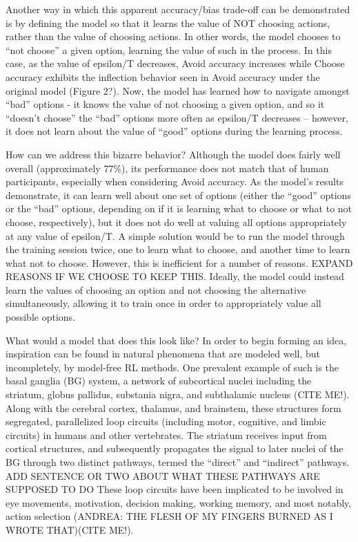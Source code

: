 \documentclass[10pt,letterpaper]{article}
\begin{document}
Another way in which this apparent accuracy/bias trade-off can be demonstrated is by defining the model so that it learns the value of NOT choosing actions, rather than the value of choosing actions. In other words, the model chooses to “not choose” a given option, learning the value of such in the process. In this case, as the value of epsilon/T decreases, Avoid accuracy increases while Choose accuracy exhibits the inflection behavior seen in Avoid accuracy under the original model (Figure 2?). Now, the model has learned how to navigate amongst “bad” options - it knows the value of not choosing a given option, and so it “doesn’t choose” the “bad” options more often as epsilon/T  decreases – however, it does not learn about the value of “good” options during the learning process.

How can we address this bizarre behavior? Although the model does fairly well overall (approximately 77\%), its performance does not match that of human participants, especially when considering Avoid accuracy. As the model’s results demonstrate, it can learn well about one set of options (either the “good” options or the “bad” options, depending on if it is learning what to choose or what to not choose, respectively), but it does not do well at valuing all options appropriately at any value of epsilon/T. A simple solution would be to run the model through the training session twice, one to learn what to choose, and another time to learn what not to choose. However, this is inefficient for a number of reasons. EXPAND REASONS IF WE CHOOSE TO KEEP THIS. Ideally, the model could instead learn the values of choosing an option and not choosing the alternative simultaneously, allowing it to train once in order to appropriately value all possible options. 

What would a model that does this look like? In order to begin forming an idea, inspiration can be found in natural phenomena that are modeled well, but incompletely, by model-free RL methods. One prevalent example of such is the basal ganglia (BG) system, a network of subcortical nuclei including the striatum, globus pallidus, substania nigra, and subthalamic nucleus (CITE ME!). Along with the cerebral cortex, thalamus, and brainstem, these structures form segregated, parallelized loop circuits (including motor, cognitive, and limbic circuits) in humans and other vertebrates. The striatum receives input from cortical structures, and subsequently propagates the signal to later nuclei of the BG through two distinct pathways, termed the “direct” and “indirect” pathways. ADD SENTENCE OR TWO ABOUT WHAT THESE PATHWAYS ARE SUPPOSED TO DO These loop circuits have been implicated to be involved in eye movements, motivation, decision making, working memory, and most notably, action selection (ANDREA: THE FLESH OF MY FINGERS BURNED AS I WROTE THAT)(CITE ME!). 
	
\end{document}
